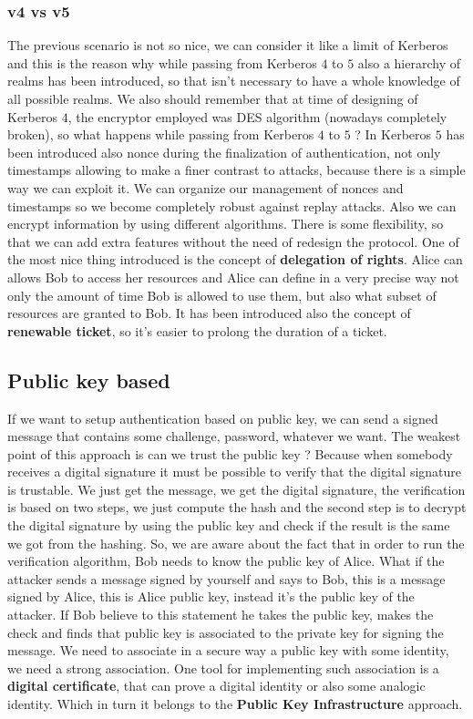 \documentclass[11pt]{article}
\begin{document}
\subsubsection{v4 vs v5}
The previous scenario is not so nice, we can consider it like a limit of Kerberos and this is the reason why while passing from Kerberos $4$ to $5$ also a hierarchy of realms has been introduced, so that isn't necessary to have a whole knowledge of all possible realms. We also should remember that at time of designing of Kerberos $4$, the encryptor employed was DES algorithm (nowadays completely broken), so what happens while passing from Kerberos $4$ to $5$ ? In Kerberos $5$ has been introduced also nonce during the finalization of authentication, not only timestamps allowing to make a finer contrast to attacks, because there is a simple way we can exploit it. We can organize our management of nonces and timestamps so we become completely robust against replay attacks. Also we can encrypt information by using different algorithms. There is some flexibility, so that we can add extra features without the need of redesign the protocol. One of the most nice thing introduced is the concept of \textbf{delegation of rights}. Alice can allows Bob to access her resources and Alice can define in a very precise way not only the amount of time Bob is allowed to use them, but also what subset of resources are granted to Bob. It has been introduced also the concept of \textbf{renewable ticket}, so it's easier to prolong the duration of a ticket.
\subsection{Public key based}
If we want to setup authentication based on public key, we can send a signed message that contains some challenge, password, whatever we want. The weakest point of this approach is can we trust the public key ? Because when somebody receives a digital signature it must be possible to verify that the digital signature is trustable. We just get the message, we get the digital signature, the verification is based on two steps, we just compute the hash and the second step is to decrypt the digital signature by using the public key and check if the result is the same we got from the hashing. So, we are aware about the fact that in order to run the verification algorithm, Bob needs to know the public key of Alice. What if the attacker sends a message signed by yourself and says to Bob, this is a message signed by Alice, this is Alice public key, instead it's the public key of the attacker. If Bob believe to this statement he takes the public key, makes the check and finds that public key is associated to the private key for signing the message. We need to associate in a secure way a public key with some identity, we need a strong association. One tool for implementing such association is a \textbf{digital certificate}, that can prove a digital identity or also some analogic identity. Which in turn it belongs to the \textbf{Public Key Infrastructure} approach.
\end{document}
